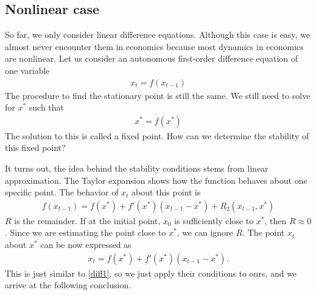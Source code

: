 \documentclass[11pt,a4paper]{book}
\theoremstyle{definition}\newtheorem{definition}{Definition}
\theoremstyle{definition}\newtheorem{fact}{Fact}
\theoremstyle{definition}\newtheorem{remark}{Remark}
\theoremstyle{definition}\newtheorem{ex}{Ex.}
\theoremstyle{definition}\newtheorem{project}{Project}
\theoremstyle{definition}\newtheorem{problem}{Problem}
\theoremstyle{definition}\newtheorem{example}{Example}
\numberwithin{theorem}{section}
\numberwithin{corollary}{chapter}
\numberwithin{assumption}{chapter}
\numberwithin{definition}{chapter}
\numberwithin{prop}{chapter}
\numberwithin{notation}{chapter}
\numberwithin{problem}{chapter}
\numberwithin{example}{chapter}
\numberwithin{fact}{chapter}
\numberwithin{ex}{chapter}
\begin{document}
	\subsection{Nonlinear case} \label{sec:nonlin_stab_dyn}
	So far, we only consider linear difference equations. Although this case is easy, we almost never encounter them in economics because most dynamics in economics are nonlinear. Let us consider an autonomous first-order difference equation of one variable
	\begin{align}
		x_{t} = f(x_{t-1}) \label{nonlin}
	\end{align}
	The procedure to find the stationary point is still the same. We still need to solve for $x^*$ such that
	\begin{align*}
		x^* = f(x^*)
	\end{align*}
	The solution to this is called a fixed point. How can we determine the stability of this fixed point? 
	
	It turns out, the idea behind the stability conditions stems from linear approximation. The Taylor expansion shows how the function behaves about one specific point. The behavior of $x_t$ about this point is
	\begin{align*}
		f(x_{t-1}) = f(x^*) + f'(x^*)(x_{t-1} - x^*) + R_2(x_{t-1}, x^*)
	\end{align*}
	$R$ is the remainder. If at the initial point, $x_0$ is sufficiently close to $x^*$, then $R \approx 0$. Since we are estimating the point close to $x^*$, we can ignore $R$. The point $x_t$ about $x^*$ can be now expressed as
	\begin{align*}
		x_t = f(x^*) + f'(x^*)(x_{t-1} - x^*).
	\end{align*}
	This is just similar to \eqref{diff1}, so we just apply their conditions to ours, and we arrive at the following conclusion.
	
\end{document}
